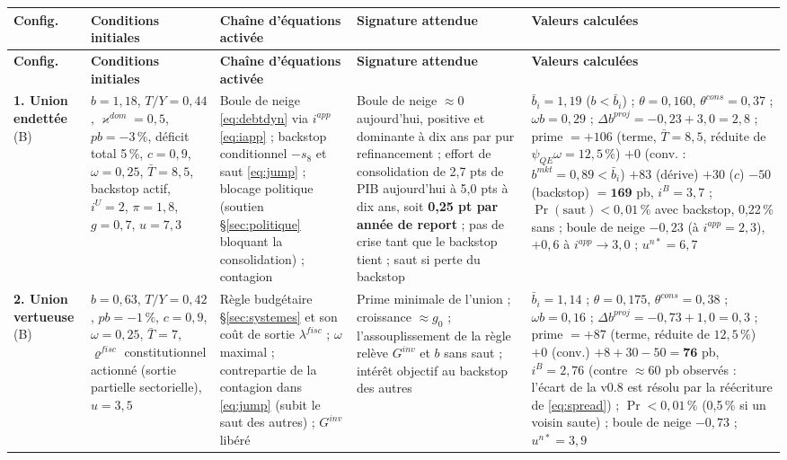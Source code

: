 \documentclass[11pt,a4paper]{article}
\begin{document}
\begin{center}\footnotesize
\begin{longtable}{p{1.6cm}p{3.1cm}p{3.4cm}p{2.9cm}p{3.5cm}}
\toprule
\textbf{Config.} & \textbf{Conditions initiales} & \textbf{Chaîne d'équations activée} & \textbf{Signature attendue} & \textbf{Valeurs calculées}\\
\midrule
\endfirsthead
\toprule
\textbf{Config.} & \textbf{Conditions initiales} & \textbf{Chaîne d'équations activée} & \textbf{Signature attendue} & \textbf{Valeurs calculées}\\
\midrule
\endhead
\textbf{1. Union endettée} (B) & $b=1{,}18$, $T/Y=0{,}44$, $\varkappa^{dom}=0{,}5$, $pb=-3\,\%$, déficit total 5\,\%, $c=0{,}9$, $\omega=0{,}25$, $\bar T=8{,}5$, backstop actif, $i^{U}=2$, $\pi=1{,}8$, $g=0{,}7$, $u=7{,}3$ & Boule de neige \eqref{eq:debtdyn} via $i^{app}$ \eqref{eq:iapp} ; backstop conditionnel $-s_8$ et saut \eqref{eq:jump} ; blocage politique (soutien \S\ref{sec:politique} bloquant la consolidation) ; contagion & Boule de neige $\approx0$ aujourd'hui, positive et dominante à dix ans par pur refinancement ; effort de consolidation de 2,7 pts de PIB aujourd'hui à 5,0 pts à dix ans, soit \textbf{0,25 pt par année de report} ; pas de crise tant que le backstop tient ; saut si perte du backstop & $\bar b_i=1{,}19$ ($b<\bar b_i$) ; $\theta=0{,}160$, $\theta^{cons}=0{,}37$ ; $\omega b=0{,}29$ ; $\Delta b^{proj}=-0{,}23+3{,}0=2{,}8$ ; prime $=+106$ (terme, $\bar T=8{,}5$, réduite de $\psi_{QE}\omega=12{,}5\,\%$) $+0$ (conv. : $b^{mkt}=0{,}89<\bar b_i$) $+83$ (dérive) $+30$ ($c$) $-50$ (backstop) $=\mathbf{169}$ pb, $i^B=3{,}7$ ; $\Pr(\text{saut})<0{,}01\,\%$ avec backstop, 0,22\,\% sans ; boule de neige $-0{,}23$ (à $i^{app}=2{,}3$), $+0{,}6$ à $i^{app}\to3{,}0$ ; $u^{n\ast}=6{,}7$\\
\midrule
\textbf{2. Union vertueuse} (B) & $b=0{,}63$, $T/Y=0{,}42$, $pb=-1\,\%$, $c=0{,}9$, $\omega=0{,}25$, $\bar T=7$, $\varrho^{fisc}$ constitutionnel actionné (sortie partielle sectorielle), $u=3{,}5$ & Règle budgétaire \S\ref{sec:systemes} et son coût de sortie $\lambda^{fisc}$ ; $\omega$ maximal ; contrepartie de la contagion dans \eqref{eq:jump} (subit le saut des autres) ; $G^{inv}$ libéré & Prime minimale de l'union ; croissance $\approx g_0$ ; l'assouplissement de la règle relève $G^{inv}$ et $b$ sans saut ; intérêt objectif au backstop des autres & $\bar b_i=1{,}14$ ; $\theta=0{,}175$, $\theta^{cons}=0{,}38$ ; $\omega b=0{,}16$ ; $\Delta b^{proj}=-0{,}73+1{,}0=0{,}3$ ; prime $=+87$ (terme, réduite de $12{,}5\,\%$) $+0$ (conv.) $+8+30-50=\mathbf{76}$ pb, $i^B=2{,}76$ (contre $\approx60$ pb observés : l'écart de la v0.8 est résolu par la réécriture de \eqref{eq:spread}) ; $\Pr<0{,}01\,\%$ (0,5\,\% si un voisin saute) ; boule de neige $-0{,}73$ ; $u^{n\ast}=3{,}9$\\

\end{longtable}
\end{center}
\end{document}
